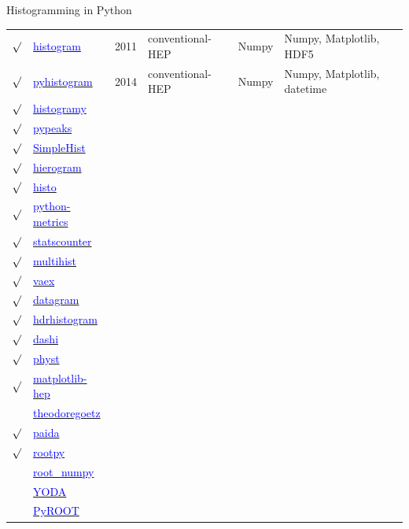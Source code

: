 \documentclass[aspectratio=169]{beamer}
\begin{document}
\begin{frame}{Histogramming in Python}
\scriptsize
\begin{tabular}{c l c p{2.5 cm} p{1 cm} p{4 cm}}
$\surd$ & \href{https://pypi.python.org/pypi/histogram}{\textcolor{blue}{histogram}} & 2011 & conventional-HEP & Numpy & Numpy, Matplotlib, HDF5 \\
$\surd$ & \href{https://pypi.python.org/pypi/pyhistogram}{\textcolor{blue}{pyhistogram}} & 2014 & conventional-HEP & Numpy & Numpy, Matplotlib, datetime \\
$\surd$ & \href{https://pypi.python.org/pypi/histogramy}{\textcolor{blue}{histogramy}} & & & & \\
$\surd$ & \href{https://pypi.python.org/pypi/pypeaks}{\textcolor{blue}{pypeaks}} & & & & \\
$\surd$ & \href{https://pypi.python.org/pypi/SimpleHist}{\textcolor{blue}{SimpleHist}} & & & & \\
$\surd$ & \href{https://pypi.python.org/pypi/hierogram}{\textcolor{blue}{hierogram}} & & & & \\
$\surd$ & \href{https://pypi.python.org/pypi/histo}{\textcolor{blue}{histo}} & & & & \\
$\surd$ & \href{https://pypi.python.org/pypi/python-metrics}{\textcolor{blue}{python-metrics}} & & & & \\
$\surd$ & \href{https://pypi.python.org/pypi/statscounter}{\textcolor{blue}{statscounter}} & & & & \\
$\surd$ & \href{https://pypi.python.org/pypi/multihist}{\textcolor{blue}{multihist}} & & & & \\
$\surd$ & \href{https://pypi.python.org/pypi/vaex}{\textcolor{blue}{vaex}} & & & & \\
$\surd$ & \href{https://pypi.python.org/pypi/datagram}{\textcolor{blue}{datagram}} & & & & \\
$\surd$ & \href{https://pypi.python.org/pypi/hdrhistogram}{\textcolor{blue}{hdrhistogram}} & & & & \\
$\surd$ & \href{http://www.ifh.de/~middell/dashi/index.html}{\textcolor{blue}{dashi}} & & & & \\
$\surd$ & \href{https://pypi.python.org/pypi/physt}{\textcolor{blue}{physt}} & & & & \\
$\surd$ & \href{https://github.com/ibab/matplotlib-hep}{\textcolor{blue}{matplotlib-hep}} & & & & \\
& \href{https://github.com/theodoregoetz/histogram}{\textcolor{blue}{theodoregoetz}} & & & & \\
$\surd$ & \href{https://pypi.org/project/paida}{\textcolor{blue}{paida}} & & & \\
$\surd$ & \href{https://pypi.org/project/rootpy}{\textcolor{blue}{rootpy}} & & & & \\
& \href{https://pypi.org/project/root_numpy}{\textcolor{blue}{root\_numpy}} & & & & \\
& \href{https://yoda.hepforge.org/pydoc}{\textcolor{blue}{YODA}} & & & & \\
& \href{https://root.cern.ch/pyroot}{\textcolor{blue}{PyROOT}} & & & & \\
\end{tabular}
\end{frame}
\end{document}
